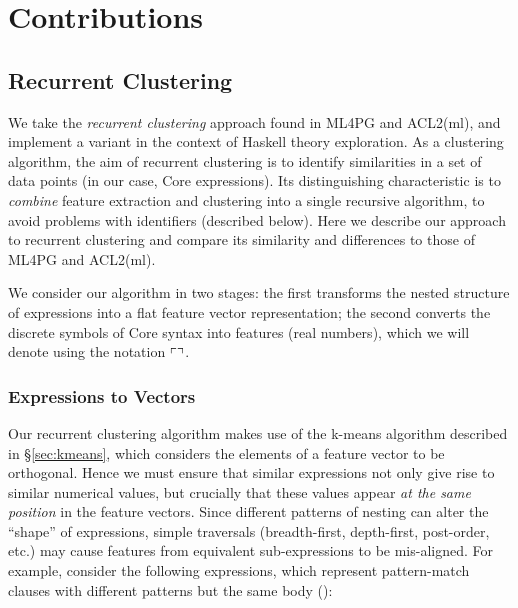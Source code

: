 \section{Contributions}
\label{sec:contributions}

\subsection{Recurrent Clustering}
\label{sec:recurrentclustering}

\iffalse TODO: Focus the section more on the problem of identifiers, and how recurrent clustering uses clustering as part of feature extraction to solve this \fi

We take the \emph{recurrent clustering} approach found in ML4PG and ACL2(ml), and implement a variant in the context of Haskell theory exploration. As a clustering algorithm, the aim of recurrent clustering is to identify similarities in a set of data points (in our case, Core expressions). Its distinguishing characteristic is to \emph{combine} feature extraction and clustering into a single recursive algorithm, to avoid problems with identifiers (described below). Here we describe our approach to recurrent clustering and compare its similarity and differences to those of ML4PG and ACL2(ml).

We consider our algorithm in two stages: the first transforms the nested structure of expressions into a flat feature vector representation; the second converts the discrete symbols of Core syntax into features (real numbers), which we will denote using the notation $\left\ulcorner  \right\urcorner$.

\subsubsection{Expressions to Vectors}

Our recurrent clustering algorithm makes use of the k-means algorithm described in \S \ref{sec:kmeans}, which considers the elements of a feature vector to be orthogonal. Hence we must ensure that similar expressions not only give rise to similar numerical values, but crucially that these values appear \emph{at the same position} in the feature vectors. Since different patterns of nesting can alter the ``shape'' of expressions, simple traversals (breadth-first, depth-first, post-order, etc.) may cause features from equivalent sub-expressions to be mis-aligned. For example, consider the following expressions, which represent pattern-match clauses with different patterns but the same body ():

